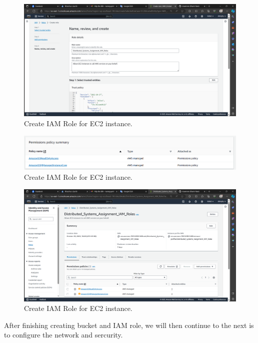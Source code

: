 \documentclass{article}
\begin{document}
\begin{figure}[h]
    \centering
    \includegraphics[width=12cm]{Pictures/Set up/IAM_Role_2.png}
    \caption{Create IAM Role for EC2 instance.}
    \label{fig:enter-label}
\end{figure}
\newpage

\begin{figure}[h]
    \centering
    \includegraphics[width=12cm]{Pictures/Set up/IAM_Role_3.png}
    \caption{Create IAM Role for EC2 instance.}
    \label{fig:enter-label}
\end{figure}

\begin{figure}[h]
    \centering
    \includegraphics[width=12cm]{Pictures/Set up/IAM_Role_4.png}
    \caption{Create IAM Role for EC2 instance.}
    \label{fig:enter-label}
\end{figure}

After finishing creating bucket and IAM role, we will then continue to the next is to configure the network and sercurity.\par
\end{document}
